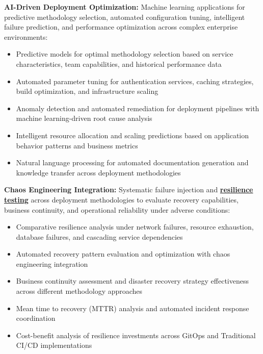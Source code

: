 \textbf{AI-Driven Deployment Optimization:} Machine learning applications for predictive methodology selection, automated configuration tuning, intelligent failure prediction, and performance optimization across complex enterprise environments:
\begin{itemize}
\item Predictive models for optimal methodology selection based on service characteristics, team capabilities, and historical performance data
\item Automated parameter tuning for authentication services, caching strategies, build optimization, and infrastructure scaling
\item Anomaly detection and automated remediation for deployment pipelines with machine learning-driven root cause analysis
\item Intelligent resource allocation and scaling predictions based on application behavior patterns and business metrics
\item Natural language processing for automated documentation generation and knowledge transfer across deployment methodologies
\end{itemize}

\textbf{Chaos Engineering Integration:} Systematic failure injection and \textbf{\hyperref[chaos_engineering]{resilience testing}} across deployment methodologies to evaluate recovery capabilities, business continuity, and operational reliability under adverse conditions:
\begin{itemize}
\item Comparative resilience analysis under network failures, resource exhaustion, database failures, and cascading service dependencies
\item Automated recovery pattern evaluation and optimization with chaos engineering integration
\item Business continuity assessment and disaster recovery strategy effectiveness across different methodology approaches
\item Mean time to recovery (MTTR) analysis and automated incident response coordination
\item Cost-benefit analysis of resilience investments across GitOps and Traditional CI/CD implementations
\end{itemize}

